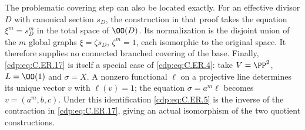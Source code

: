 The problematic covering step can also be located exactly. For an
effective divisor $D$ with canonical section $s_D$, the construction
in that proof takes the equation $\xi^m=s_D^m$ in the total space of
$\OO(D)$. Its normalization is the disjoint union of the $m$ global
graphs $\xi=\zeta s_D$, $\zeta^m=1$, each isomorphic to the original
space. It therefore supplies no connected branched covering of the
base. Finally, \eqref{cdp:eq:C.ER.17} is itself a special case of \eqref{cdp:eq:C.ER.4}: take
$V=\PP^2$, $L=\OO(1)$ and $\sigma=X$. A nonzero functional
$\ell$ on a projective line determines its unique vector $v$ with
$\ell(v)=1$; the equation $\sigma=a^m\ell$ becomes
$v=(a^m,b,c)$. Under this identification \eqref{cdp:eq:C.ER.5} is the inverse
of the contraction in \eqref{cdp:eq:C.ER.17}, giving an actual isomorphism of
the two quotient constructions.


